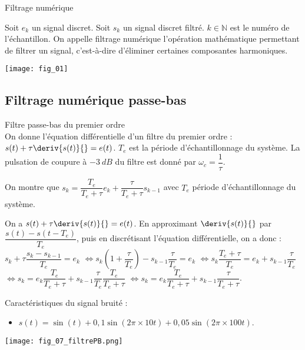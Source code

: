 \begin{defi}{Filtrage numérique}~\\
\begin{minipage}[c]{.7\linewidth}
Soit $e_k$ un signal discret. Soit $s_k$ un signal discret filtré. $k\in \mathbb{N}$ est le numéro de l'échantillon. On appelle filtrage numérique l'opération mathématique permettant de filtrer un signal, c'est-à-dire d'éliminer certaines composantes harmoniques. 
\end{minipage} \hfill
\begin{minipage}[c]{.25\linewidth}
\begin{center}
\texttt{[image: fig\_01]}
\end{center}
\end{minipage}
\end{defi}

\subsection{Filtrage numérique passe-bas}
\begin{defi}{Filtre passe-bas du premier ordre}~\\
On donne l'équation différentielle d'un filtre du premier ordre : $s(t)+\tau \deriv{s(t)}{} = e(t)$.  $T_e$ est la période d'échantillonnage du système. La pulsation de coupure à $-\SI{3}{dB}$ du filtre est donné par $\omega_c = \dfrac{1}{\tau}$.

On montre que $s_k = \dfrac{T_e}{T_e+\tau} e_k + \dfrac{\tau}{T_e+\tau} s_{k-1}$ avec $T_e$ période d'échantillonnage du système.  
\end{defi}

\begin{demo}
On a  $s(t)+\tau \deriv{s(t)}{} = e(t)$. En approximant $\deriv{s(t)}{}$ par $\dfrac{s(t) -s(t-T_e)}{T_e}$, puis en discrétisant l'équation différentielle, on a donc : 
 $s_k +\tau \dfrac{s_k - s_{k-1}}{T_e} = e_k$
 $\Leftrightarrow s_k \left(1+\dfrac{\tau}{T_e}\right) - s_{k-1}\dfrac{\tau}{T_e} = e_k$
 $\Leftrightarrow s_k \dfrac{T_e+\tau}{T_e}  = e_k + s_{k-1}\dfrac{\tau}{T_e}$
 $\Leftrightarrow s_k   = e_k \dfrac{T_e}{T_e+\tau}+ s_{k-1}\dfrac{\tau}{T_e}\dfrac{T_e}{T_e+\tau}$
 $\Leftrightarrow s_k   = e_k \dfrac{T_e}{T_e+\tau}+ s_{k-1}\dfrac{\tau}{T_e+\tau}$.
\end{demo}

\begin{minipage}[c]{.48\linewidth}
Caractéristiques du signal bruité :
\begin{itemize}
\item $s(t)=\sin(t) + 0,1\sin(2\pi \times 10 t)+ 0,05\sin(2\pi \times 100 t)$.
\end{itemize}
\end{minipage}
\begin{minipage}[c]{.48\linewidth}
\begin{center}
\texttt{[image: fig\_07\_filtrePB.png]}
\end{center}
\end{minipage}



